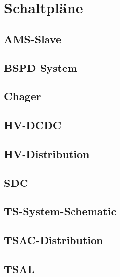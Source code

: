 
%
%
%
%

\section{Schaltpläne}
\subsection{\ac{AMS}-Slave}

\subsection{\ac{BSPD} System}

\subsection{Chager}

\subsection{\ac{HV}-DCDC}

\subsection{HV-Distribution}

\subsection{\ac{SDC}}

\subsection{\ac{TS}-System-Schematic}

\subsection{\ac{TSAC}-Distribution}

\subsection{\ac{TSAL}}

